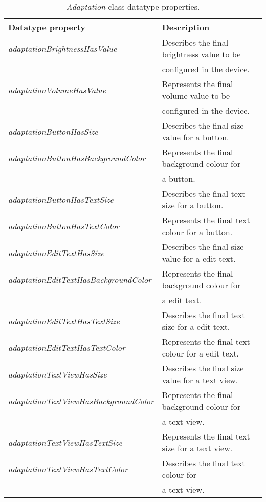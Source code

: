 \begin{table}
  \caption{\textit{Adaptation} class datatype properties.}
 \label{tbl:adaptation_properties}
\footnotesize
\centering
 \begin{tabular}{l l}
  \hline 
  \textbf{Datatype property} 			& \textbf{Description}				\\
  \hline
  \textit{adaptationBrightnessHasValue}		& Describes the final brightness value to be 	\\
						& configured in the device. 			\\
  \textit{adaptationVolumeHasValue}		& Represents the final volume value to be 	\\
						& configured in the device. 			\\
  \textit{adaptationButtonHasSize}		& Describes the final size value for a button. 	\\
  \textit{adaptationButtonHasBackgroundColor}	& Represents the final background colour for 	\\
						& a button.					\\
  \textit{adaptationButtonHasTextSize}		& Describes the final text size for a button.	\\
  \textit{adaptationButtonHasTextColor}		& Represents the final text colour for a button.\\
  \textit{adaptationEditTextHasSize}		& Describes the final size value for a edit text.\\
  \textit{adaptationEditTextHasBackgroundColor}	& Represents the final background colour for 	\\ 
						& a edit text.					\\
  \textit{adaptationEditTextHasTextSize}	& Describes the final text size for a edit text.\\
  \textit{adaptationEditTextHasTextColor}	& Represents the final text colour for a edit text.\\
  \textit{adaptationTextViewHasSize}		& Describes the final size value for a text view.\\
  \textit{adaptationTextViewHasBackgroundColor}	& Represents the final background colour for 	\\
						& a text view.					\\
  \textit{adaptationTextViewHasTextSize}	& Represents the final text size for a text view.\\
  \textit{adaptationTextViewHasTextColor}	& Describes the final text colour for 		\\
						& a text view.		 			\\
  \hline
  
\end{tabular}
\end{table}


